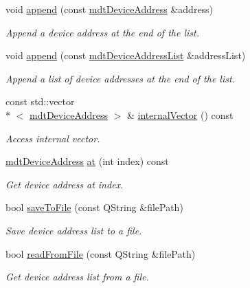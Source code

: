 \begin{DoxyCompactItemize}
void \hyperlink{classmdt_device_address_list_a1e1dda17f9b235f62921dcf4a90084fe}{append} (const \hyperlink{classmdt_device_address}{mdt\-Device\-Address} \&address)
\begin{DoxyCompactList}\small\item\em Append a device address at the end of the list. \end{DoxyCompactList}\item 
void \hyperlink{classmdt_device_address_list_a204ed0d2fbb8812159bfd1cb708f514a}{append} (const \hyperlink{classmdt_device_address_list}{mdt\-Device\-Address\-List} \&address\-List)
\begin{DoxyCompactList}\small\item\em Append a list of device addresses at the end of the list. \end{DoxyCompactList}\item 
const std\-::vector\\*
$<$ \hyperlink{classmdt_device_address}{mdt\-Device\-Address} $>$ \& \hyperlink{classmdt_device_address_list_a70c66586e0595b4ba56b232a5b3d677b}{internal\-Vector} () const 
\begin{DoxyCompactList}\small\item\em Access internal vector. \end{DoxyCompactList}\item 
\hyperlink{classmdt_device_address}{mdt\-Device\-Address} \hyperlink{classmdt_device_address_list_a748daf1e8b11a455908389c5788d90b0}{at} (int index) const 
\begin{DoxyCompactList}\small\item\em Get device address at index. \end{DoxyCompactList}\item 
bool \hyperlink{classmdt_device_address_list_a2681c4b394c69da322876ba5ed480309}{save\-To\-File} (const Q\-String \&file\-Path)
\begin{DoxyCompactList}\small\item\em Save device address list to a file. \end{DoxyCompactList}\item 
bool \hyperlink{classmdt_device_address_list_aa074440bf05de9590809581d6500b257}{read\-From\-File} (const Q\-String \&file\-Path)
\begin{DoxyCompactList}\small\item\em Get device address list from a file. \end{DoxyCompactList}\end{DoxyCompactItemize}


